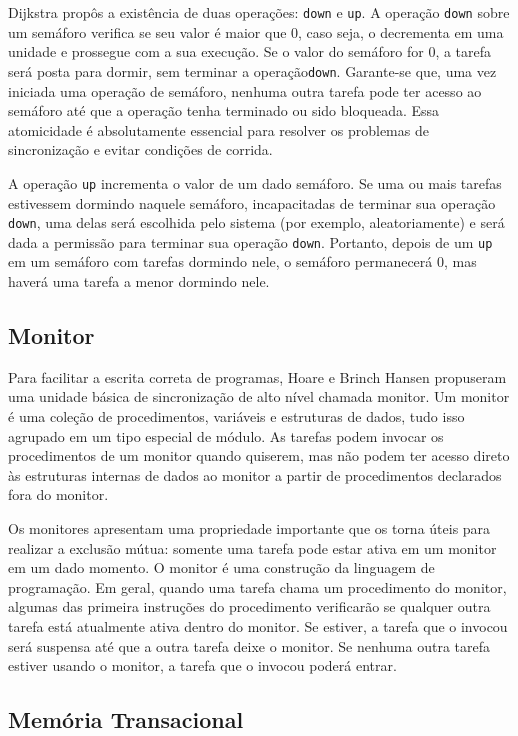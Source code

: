 Dijkstra propôs a existência de duas operações: \texttt{down} e
\texttt{up}. A operação \texttt{down} sobre um semáforo verifica se seu
valor é maior que 0, caso seja, o decrementa em uma unidade e prossegue
com a sua execução.  Se o valor do semáforo for 0, a tarefa será posta
para dormir, sem terminar a operação\texttt{down}. Garante-se que, uma vez
iniciada uma operação de semáforo, nenhuma outra tarefa pode ter acesso
ao semáforo até que a operação tenha terminado ou sido bloqueada. Essa
atomicidade é absolutamente essencial para resolver os problemas de
sincronização e evitar condições de corrida.

A operação \texttt{up} incrementa o valor de um dado semáforo. Se uma
ou mais tarefas estivessem dormindo naquele semáforo, incapacitadas de
terminar sua operação \texttt{down}, uma delas será escolhida pelo sistema
(por exemplo, aleatoriamente) e será dada a permissão para terminar sua
operação \texttt{down}. Portanto, depois de um \texttt{up} em um semáforo
com tarefas dormindo nele, o semáforo permanecerá 0, mas haverá uma tarefa
a menor dormindo nele.

\subsection{Monitor}

Para facilitar a escrita correta de programas, Hoare e Brinch Hansen propuseram
uma unidade básica de sincronização de alto nível chamada monitor.
Um monitor é uma coleção de procedimentos, variáveis e estruturas de dados,
tudo isso agrupado em um tipo especial de módulo. As tarefas podem invocar
os procedimentos de um monitor quando quiserem, mas não podem ter acesso
direto às estruturas internas de dados ao monitor a partir de procedimentos
declarados fora do monitor.

Os monitores apresentam uma propriedade importante que os torna úteis
para realizar a exclusão mútua: somente uma tarefa pode estar ativa em um
monitor em um dado momento. O monitor é uma construção da linguagem de
programação. Em geral, quando uma tarefa chama um procedimento do monitor,
algumas das primeira instruções do procedimento verificarão se qualquer
outra tarefa está atualmente ativa dentro do monitor. Se estiver, a tarefa
que o invocou será suspensa até que a outra tarefa deixe o monitor. Se nenhuma
outra tarefa estiver usando o monitor, a tarefa que o invocou poderá entrar.


\subsection{Memória Transacional}


